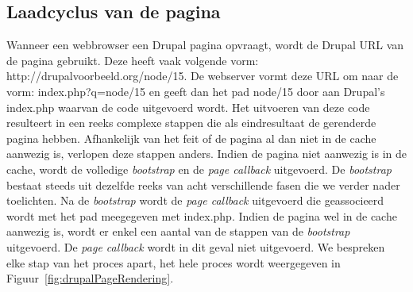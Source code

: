 \subsection{Laadcyclus van de pagina}
Wanneer een webbrowser een Drupal pagina opvraagt, wordt de Drupal URL van de pagina gebruikt. Deze heeft vaak volgende vorm: http://drupalvoorbeeld.org/node/15. De webserver vormt deze URL om naar de vorm: index.php?q=node/15 en geeft dan het pad node/15 door aan Drupal's index.php waarvan de code uitgevoerd wordt. Het uitvoeren van deze code resulteert in een reeks complexe stappen die als eindresultaat de gerenderde pagina hebben. Afhankelijk van het feit of de pagina al dan niet in de cache aanwezig is, verlopen deze stappen anders. Indien de pagina niet aanwezig is in de cache, wordt de volledige \textit{bootstrap} en de \textit{page callback} uitgevoerd. De \textit{bootstrap} bestaat steeds uit dezelfde reeks van acht verschillende fasen die we verder nader toelichten. Na de \textit{bootstrap} wordt de \textit{page callback} uitgevoerd die geassocieerd wordt met het pad meegegeven met index.php. Indien de pagina wel in de cache aanwezig is, wordt er enkel een aantal van de stappen van de \textit{bootstrap} uitgevoerd. De \textit{page callback} wordt in dit geval niet uitgevoerd. We bespreken elke stap van het proces apart, het hele proces wordt weergegeven in Figuur~\ref{fig:drupalPageRendering}.

